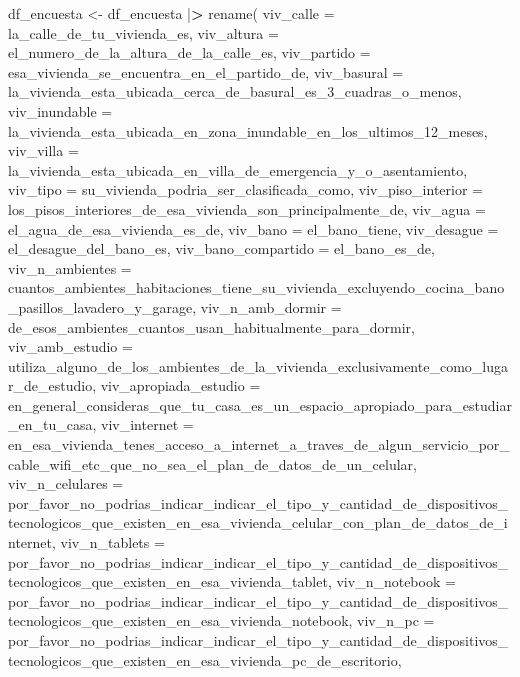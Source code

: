 \documentclass[
]{book}
\newenvironment{Shaded}{\begin{snugshade}}{\end{snugshade}}
\newcommand{\AttributeTok}[1]{\textcolor[rgb]{0.77,0.63,0.00}{#1}}
\newcommand{\ErrorTok}[1]{\textcolor[rgb]{0.64,0.00,0.00}{\textbf{#1}}}
\newcommand{\FunctionTok}[1]{\textcolor[rgb]{0.00,0.00,0.00}{#1}}
\newcommand{\NormalTok}[1]{#1}
\newcommand{\OtherTok}[1]{\textcolor[rgb]{0.56,0.35,0.01}{#1}}
\newcommand{\SpecialCharTok}[1]{\textcolor[rgb]{0.00,0.00,0.00}{#1}}
\theoremstyle{definition}
\theoremstyle{definition}
\theoremstyle{definition}
\theoremstyle{definition}
\theoremstyle{remark}
\begin{document}
\begin{Shaded}
\begin{Highlighting}[]
\NormalTok{df\_encuesta }\OtherTok{\textless{}{-}}\NormalTok{ df\_encuesta }\SpecialCharTok{|}\ErrorTok{\textgreater{}}
\FunctionTok{rename}\NormalTok{(}
\AttributeTok{viv\_calle =}\NormalTok{ la\_calle\_de\_tu\_vivienda\_es,}
\AttributeTok{viv\_altura =}\NormalTok{ el\_numero\_de\_la\_altura\_de\_la\_calle\_es,}
\AttributeTok{viv\_partido =}\NormalTok{ esa\_vivienda\_se\_encuentra\_en\_el\_partido\_de,}
\AttributeTok{viv\_basural =}\NormalTok{ la\_vivienda\_esta\_ubicada\_cerca\_de\_basural\_es\_3\_cuadras\_o\_menos,}
\AttributeTok{viv\_inundable =}\NormalTok{ la\_vivienda\_esta\_ubicada\_en\_zona\_inundable\_en\_los\_ultimos\_12\_meses,}
\AttributeTok{viv\_villa =}\NormalTok{ la\_vivienda\_esta\_ubicada\_en\_villa\_de\_emergencia\_y\_o\_asentamiento,}
\AttributeTok{viv\_tipo =}\NormalTok{ su\_vivienda\_podria\_ser\_clasificada\_como,}
\AttributeTok{viv\_piso\_interior =}\NormalTok{ los\_pisos\_interiores\_de\_esa\_vivienda\_son\_principalmente\_de,}
\AttributeTok{viv\_agua =}\NormalTok{ el\_agua\_de\_esa\_vivienda\_es\_de,}
\AttributeTok{viv\_bano =}\NormalTok{ el\_bano\_tiene,}
\AttributeTok{viv\_desague =}\NormalTok{ el\_desague\_del\_bano\_es,}
\AttributeTok{viv\_bano\_compartido =}\NormalTok{ el\_bano\_es\_de,}
\AttributeTok{viv\_n\_ambientes =}\NormalTok{ cuantos\_ambientes\_habitaciones\_tiene\_su\_vivienda\_excluyendo\_cocina\_bano\_pasillos\_lavadero\_y\_garage,}
\AttributeTok{viv\_n\_amb\_dormir =}\NormalTok{ de\_esos\_ambientes\_cuantos\_usan\_habitualmente\_para\_dormir,}
\AttributeTok{viv\_amb\_estudio =}\NormalTok{ utiliza\_alguno\_de\_los\_ambientes\_de\_la\_vivienda\_exclusivamente\_como\_lugar\_de\_estudio,}
\AttributeTok{viv\_apropiada\_estudio =}\NormalTok{ en\_general\_consideras\_que\_tu\_casa\_es\_un\_espacio\_apropiado\_para\_estudiar\_en\_tu\_casa,}
\AttributeTok{viv\_internet =}\NormalTok{ en\_esa\_vivienda\_tenes\_acceso\_a\_internet\_a\_traves\_de\_algun\_servicio\_por\_cable\_wifi\_etc\_que\_no\_sea\_el\_plan\_de\_datos\_de\_un\_celular,}
\AttributeTok{viv\_n\_celulares =}\NormalTok{ por\_favor\_no\_podrias\_indicar\_indicar\_el\_tipo\_y\_cantidad\_de\_dispositivos\_tecnologicos\_que\_existen\_en\_esa\_vivienda\_celular\_con\_plan\_de\_datos\_de\_internet,}
\AttributeTok{viv\_n\_tablets =}\NormalTok{ por\_favor\_no\_podrias\_indicar\_indicar\_el\_tipo\_y\_cantidad\_de\_dispositivos\_tecnologicos\_que\_existen\_en\_esa\_vivienda\_tablet,}
\AttributeTok{viv\_n\_notebook =}\NormalTok{ por\_favor\_no\_podrias\_indicar\_indicar\_el\_tipo\_y\_cantidad\_de\_dispositivos\_tecnologicos\_que\_existen\_en\_esa\_vivienda\_notebook,}
\AttributeTok{viv\_n\_pc =}\NormalTok{ por\_favor\_no\_podrias\_indicar\_indicar\_el\_tipo\_y\_cantidad\_de\_dispositivos\_tecnologicos\_que\_existen\_en\_esa\_vivienda\_pc\_de\_escritorio,}

\end{Highlighting}
\end{Shaded}
\end{document}
